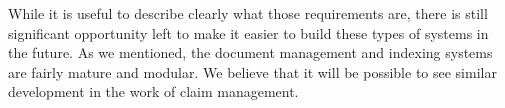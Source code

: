 \documentclass[format=siggraph, review=true]{acmart}
\begin{document}
While it is useful to describe clearly what those requirements are,
there is still significant opportunity left to make it easier to build
these types of systems in the future. As we mentioned, the document
management and indexing systems are fairly mature and modular. We
believe that it will be possible to see similar development in the
work of claim management. 
\end{document}
